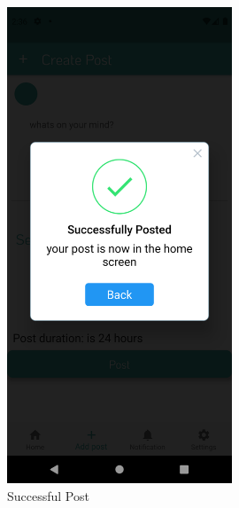 \documentclass[12pt]{article}
\begin{document}
\begin{figure}[h!]

\centerline{\includegraphics[width=0.6\textwidth]{./Screenshots/12.PNG}}
  \caption{Successful Post}
  \end{figure}
\end{document}
